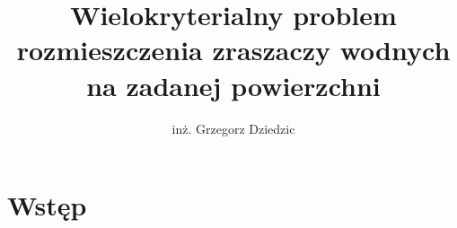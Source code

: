 \documentclass[twoside]{iisthesis}
\newcommand{\myfigure}[1]{%
\addcontentsline{figu}{myfigure}{\protect\numberline{\thefigure}#1}\par}
\begin{document}
\newcommand{\resultChart}[7][140]{
\def\dataS{{#2}}
	\begin{figure}[H]
	
\centering

\begin{center}
\begin{tikzpicture}
 
\begin{axis}[
ybar,
bar width=20,
legend style={at={(0.5,-0.25)},
anchor=north,legend columns=-1},
ylabel={Wartość miary},
symbolic x coords={\dataS},
xtick=data,
height=  {#1},
width=0.8\textwidth,
ymin=0, ytick={0,0.5,1},
ymax=1.5,
nodes near coords,
nodes near coords align={vertical},
]
\addplot coordinates { (\dataS,{#3}) };
\addplot coordinates {(\dataS,{#4}) };
\addplot coordinates { (\dataS,{#5}) };
\legend{Recall,Precission,F1-Score}
\end{axis}
\end{tikzpicture}
\end{center}
\caption{{#6}}
\myfigure{{#6}}
\label{{#7}}
\end{figure}
}


%
\nocite{*}
\title{ Wielokryterialny problem rozmieszczenia zraszaczy wodnych na zadanej powierzchni }
\author{inż. Grzegorz Dziedzic}

\date{\number\the\year}




\maketitle

\textpages


\graphicspath{ {img/} }
\chapter{Wstęp}
\end{document}
